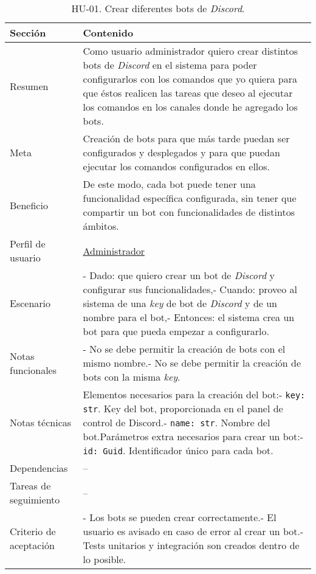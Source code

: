 \begin{table}[H]
    \centering
    \def\arraystretch{1.25}
    \begin{adjustbox}{max width=\textwidth}
    \begin{tabularx}{\textwidth}{l|L}
    \hline
        \textbf{Sección} & \textbf{Contenido} \\ \hline
    \hline
        Resumen & Como usuario administrador quiero crear distintos bots de \textit{Discord} en el sistema para poder configurarlos con los comandos que yo quiera para que éstos realicen las tareas que deseo al ejecutar los comandos en los canales donde he agregado los bots. \\ \hline
        Meta & Creación de bots para que más tarde puedan ser configurados y desplegados y para que puedan ejecutar los comandos configurados en ellos. \\ \hline
        Beneficio & De este modo, cada bot puede tener una funcionalidad específica configurada, sin tener que compartir un bot con funcionalidades de distintos ámbitos. \\ \hline
        Perfil de usuario & \hyperref[sec:personaAdmin]{Administrador} \\ \hline
        Escenario & - Dado: que quiero crear un bot de \textit{Discord} y configurar sus funcionalidades,\linebreak - Cuando: proveo al sistema de una \textit{key} de bot de \textit{Discord} y de un nombre para el bot,\linebreak - Entonces: el sistema crea un bot para que pueda empezar a configurarlo. \\ \hline
        Notas funcionales & - No se debe permitir la creación de bots con el mismo nombre.\linebreak - No se debe permitir la creación de bots con la misma \textit{key}. \\ \hline
        Notas técnicas & Elementos necesarios para la creación del bot:\linebreak - \verb|key: str|. Key del bot, proporcionada en el panel de control de Discord.\linebreak - \verb|name: str|. Nombre del bot.\linebreak \linebreak Parámetros extra necesarios para crear un bot:\linebreak - \verb|id: Guid|. Identificador único para cada bot. \\ \hline
        Dependencias & – \\ \hline
        Tareas de seguimiento & – \\ \hline
        Criterio de aceptación & - Los bots se pueden crear correctamente.\linebreak - El usuario es avisado en caso de error al crear un bot.\linebreak - Tests unitarios y integración son creados dentro de lo posible. \\ \hline
    \end{tabularx}
    \end{adjustbox}
    \caption{HU-01. Crear diferentes bots de \textit{Discord}.}
\end{table}


